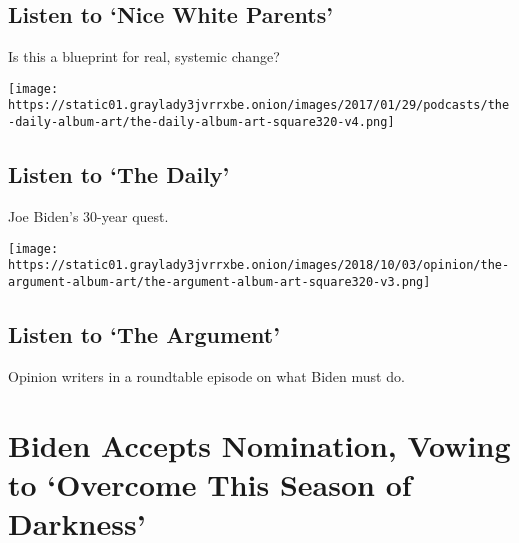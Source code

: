 \href{/2020/07/30/podcasts/nice-white-parents-serial.html}{}

\hypertarget{listen-to-nice-white-parents}{%
\subsection{Listen to `Nice White
Parents'}\label{listen-to-nice-white-parents}}

Is this a blueprint for real, systemic change?

\href{/2020/08/20/podcasts/the-daily/biden-election.html}{}

\texttt{[image: https://static01.graylady3jvrrxbe.onion/images/2017/01/29/podcasts/the-daily-album-art/the-daily-album-art-square320-v4.png]}

\href{/2020/08/20/podcasts/the-daily/biden-election.html}{}

\hypertarget{listen-to-the-daily}{%
\subsection{Listen to `The Daily'}\label{listen-to-the-daily}}

Joe Biden's 30-year quest.

\href{/2020/08/20/opinion/the-argument-democratic-convention-biden.html}{}

\texttt{[image: https://static01.graylady3jvrrxbe.onion/images/2018/10/03/opinion/the-argument-album-art/the-argument-album-art-square320-v3.png]}

\href{/2020/08/20/opinion/the-argument-democratic-convention-biden.html}{}

\hypertarget{listen-to-the-argument}{%
\subsection{Listen to `The Argument'}\label{listen-to-the-argument}}

Opinion writers in a roundtable episode on what Biden must do.

\href{https://www.nytimes3xbfgragh.onion/2020/08/20/us/politics/Joe-Biden-accepts-democratic-nomination.html}{}

\hypertarget{biden-accepts-nomination-vowing-to-overcome-this-season-of-darkness}{%
\section{Biden Accepts Nomination, Vowing to `Overcome This Season of
Darkness'}\label{biden-accepts-nomination-vowing-to-overcome-this-season-of-darkness}}

